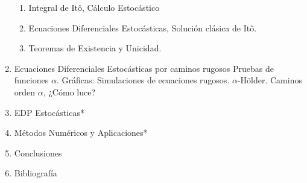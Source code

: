 \documentclass[12pt, twocolumns]{book}
\begin{document}
\begin{enumerate}
\begin{enumerate}
	\item Integral de Itô, Cálculo Estocástico
	\item Ecuaciones Diferenciales Estocásticas, Solución clásica de Itô.
	\item Teoremas de Existencia y Unicidad.

\end{enumerate}



\item Ecuaciones Diferenciales Estocásticas por caminos rugosos
Pruebas de funciones $\alpha$.
Gráficas: Simulaciones de ecuaciones rugosos. $\alpha$-Hölder.
Caminos orden $\alpha$, ¿Cómo luce?



\item EDP Estocásticas*
\item Métodos Numéricos y Aplicaciones*
\item Conclusiones
\item Bibliografía

\end{enumerate}

\newpage





\tableofcontents





















\end{document}
